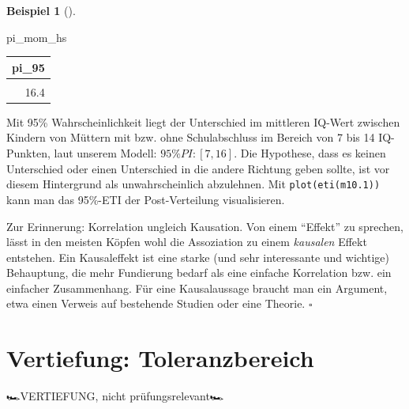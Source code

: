 \documentclass[
  ngerman,
  letterpaper,
  twoside,
  open=any]{scrbook}
\newenvironment{Shaded}{\begin{snugshade}}{\end{snugshade}}
\newcommand{\NormalTok}[1]{\textcolor[rgb]{0.00,0.23,0.31}{#1}}
\newcounter{none} %
\theoremstyle{definition}
\newtheorem{example}{Beispiel}[chapter]
\theoremstyle{plain}
\theoremstyle{definition}
\theoremstyle{definition}
\theoremstyle{remark}
\begin{document}
\begin{example}[]
\begin{Shaded}
\begin{Highlighting}[]
\NormalTok{pi\_mom\_hs}
\end{Highlighting}
\end{Shaded}

{\def\LTcaptype{none} %
\begin{longtable}[]{@{}r@{}}
\toprule\noalign{}
pi\_95 \\
\midrule\noalign{}
\endhead
\bottomrule\noalign{}
\endlastfoot
7.3 \\
16.4 \\
\end{longtable}
}

Mit 95\% Wahrscheinlichkeit liegt der Unterschied im mittleren IQ-Wert
zwischen Kindern von Müttern mit bzw. ohne Schulabschluss im Bereich von
7 bis 14 IQ-Punkten, laut unserem Modell: \(95\%PI: [7,16]\). Die
Hypothese, dass es keinen Unterschied oder einen Unterschied in die
andere Richtung geben sollte, ist vor diesem Hintergrund als
unwahrscheinlich abzulehnen. Mit \texttt{plot(eti(m10.1))} kann man das
95\%-ETI der Post-Verteilung visualisieren.

\begin{tcolorbox}[enhanced jigsaw, arc=.35mm, bottomrule=.15mm, bottomtitle=1mm, breakable, colback=white, colbacktitle=quarto-callout-important-color!10!white, colframe=quarto-callout-important-color-frame, coltitle=black, left=2mm, leftrule=.75mm, opacityback=0, opacitybacktitle=0.6, rightrule=.15mm, title=\textcolor{quarto-callout-important-color}{\faExclamation}\hspace{0.5em}{Wichtig}, titlerule=0mm, toprule=.15mm, toptitle=1mm]

Zur Erinnerung: Korrelation ungleich Kausation. Von einem
\enquote{Effekt} zu sprechen, lässt in den meisten Köpfen wohl die
Assoziation zu einem \emph{kausalen} Effekt entstehen. Ein Kausaleffekt
ist eine starke (und sehr interessante und wichtige) Behauptung, die
mehr Fundierung bedarf als eine einfache Korrelation bzw. ein einfacher
Zusammenhang. Für eine Kausalaussage braucht man ein Argument, etwa
einen Verweis auf bestehende Studien oder eine Theorie. \(\square\)

\end{tcolorbox}

\section{Vertiefung: Toleranzbereich}\label{sec-toleranz}

🏎️VERTIEFUNG, nicht prüfungsrelevant🏎️


\end{example}
\end{document}
